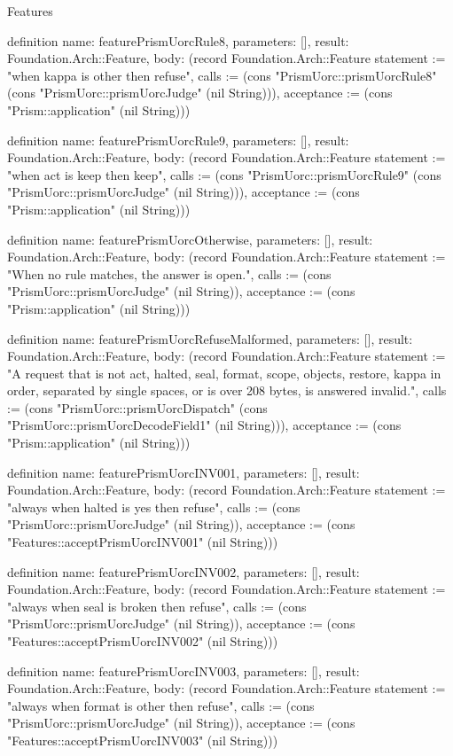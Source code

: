 \begin{lexlean}{Features}
\begin{semanticmodule}
definition{
  name: featurePrismUorcRule8,
  parameters: [],
  result: Foundation.Arch::Feature,
  body: (record Foundation.Arch::Feature {statement := "when kappa is other then refuse", calls := (cons "PrismUorc::prismUorcRule8" (cons "PrismUorc::prismUorcJudge" (nil String))), acceptance := (cons "Prism::application" (nil String))})
}

definition{
  name: featurePrismUorcRule9,
  parameters: [],
  result: Foundation.Arch::Feature,
  body: (record Foundation.Arch::Feature {statement := "when act is keep then keep", calls := (cons "PrismUorc::prismUorcRule9" (cons "PrismUorc::prismUorcJudge" (nil String))), acceptance := (cons "Prism::application" (nil String))})
}

definition{
  name: featurePrismUorcOtherwise,
  parameters: [],
  result: Foundation.Arch::Feature,
  body: (record Foundation.Arch::Feature {statement := "When no rule matches, the answer is open.", calls := (cons "PrismUorc::prismUorcJudge" (nil String)), acceptance := (cons "Prism::application" (nil String))})
}

definition{
  name: featurePrismUorcRefuseMalformed,
  parameters: [],
  result: Foundation.Arch::Feature,
  body: (record Foundation.Arch::Feature {statement := "A request that is not act, halted, seal, format, scope, objects, restore, kappa in order, separated by single spaces, or is over 208 bytes, is answered invalid.", calls := (cons "PrismUorc::prismUorcDispatch" (cons "PrismUorc::prismUorcDecodeField1" (nil String))), acceptance := (cons "Prism::application" (nil String))})
}

definition{
  name: featurePrismUorcINV001,
  parameters: [],
  result: Foundation.Arch::Feature,
  body: (record Foundation.Arch::Feature {statement := "always when halted is yes then refuse", calls := (cons "PrismUorc::prismUorcJudge" (nil String)), acceptance := (cons "Features::acceptPrismUorcINV001" (nil String))})
}

definition{
  name: featurePrismUorcINV002,
  parameters: [],
  result: Foundation.Arch::Feature,
  body: (record Foundation.Arch::Feature {statement := "always when seal is broken then refuse", calls := (cons "PrismUorc::prismUorcJudge" (nil String)), acceptance := (cons "Features::acceptPrismUorcINV002" (nil String))})
}

definition{
  name: featurePrismUorcINV003,
  parameters: [],
  result: Foundation.Arch::Feature,
  body: (record Foundation.Arch::Feature {statement := "always when format is other then refuse", calls := (cons "PrismUorc::prismUorcJudge" (nil String)), acceptance := (cons "Features::acceptPrismUorcINV003" (nil String))})
}


\end{semanticmodule}
\end{lexlean}
